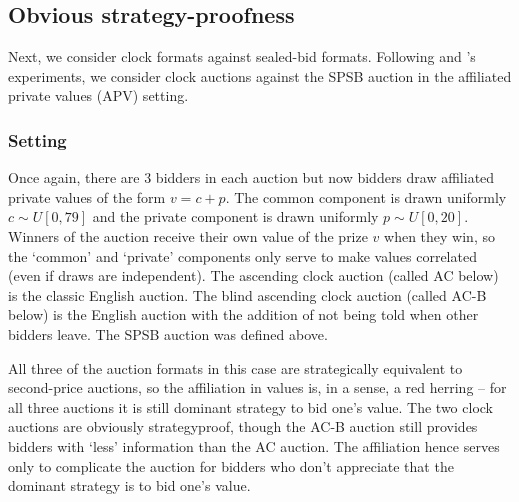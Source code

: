 \documentclass{article} %
\begin{document}



\subsection{Obvious strategy-proofness}\label{session:OSP}
Next, we consider clock formats against sealed-bid formats. Following \cite{li2017obviously} and \cite{breitmoser2022obviousness}'s experiments, we consider clock auctions against the SPSB auction in the affiliated private values (APV) setting. 

\subsubsection{Setting}
Once again, there are $3$ bidders in each auction but now bidders draw affiliated private values of the form $v = c + p$. 
The common component is drawn uniformly $c \sim U[0, 79]$ and the private component is drawn uniformly $p \sim U[0, 20]$. 
Winners of the auction receive their own value of the prize $v$ when they win, so the `common' and `private' components only serve to make values correlated (even if draws are independent). 
The ascending clock auction (called AC below) is the classic English auction. 
The blind ascending clock auction (called AC-B below) is the English auction with the addition of not being told when other bidders leave. 
The SPSB auction was defined above. 

All three of the auction formats in this case are strategically equivalent to second-price auctions, so the affiliation in values is, in a sense, a red herring -- for all three auctions it is still dominant strategy to bid one's value. 
The two clock auctions are obviously strategyproof, though the AC-B auction still provides bidders with `less' information than the AC auction. 
The affiliation hence serves only to complicate the auction for bidders who don't appreciate that the dominant strategy is to bid one's value. 
\end{document}

